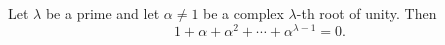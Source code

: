 Let $\lambda$ be a prime and let $\alpha \neq 1$ be a complex $\lambda$-th root of unity. Then
$$1 + \alpha + \alpha^2 + \cdots + \alpha^{\lambda-1} = 0.$$
